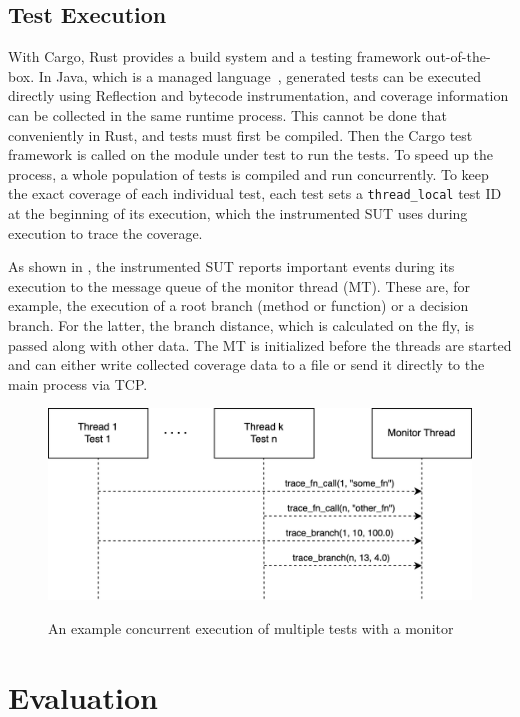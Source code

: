 \documentclass[paper=a4,%
  twoside,%
  BCOR4mm,%
  abstract=true,%
  toc=bibliography,%
  chapterprefix=true,%
  toc=bibliographynumbered,%
  open=right,%
  english,%
  pagesize=pdftex]{scrreprt}
\begin{document}
\section{Test Execution}
With Cargo, Rust provides a build system and a testing framework out-of-the-box. In Java, which is a managed language~\cite{Gough2005}, generated tests can be executed directly using Reflection and bytecode instrumentation, and coverage information can be collected in the same runtime process. This cannot be done that conveniently in Rust, and tests must first be compiled. Then the Cargo test framework is called on the module under test to run the tests. To speed up the process, a whole population of tests is compiled and run concurrently. To keep the exact coverage of each individual test, each test sets a \texttt{thread\string_local} test ID at the beginning of its execution, which the instrumented \ac{SUT} uses during execution to trace the coverage.

As shown in , the instrumented \ac{SUT} reports important events during its execution to the message queue of the monitor thread (MT). These are, for example, the execution of a root branch (method or function) or a decision branch. For the latter, the branch distance, which is calculated on the fly, is passed along with other data. The MT is initialized before the threads are started and can either write collected coverage data to a file or send it directly to the main process via \ac{TCP}.

\begin{figure}[h]
\caption{An example concurrent execution of multiple tests with a monitor}
\centering
\includegraphics[width=\textwidth]{test-execution}
\label{fig:test-execution}
\end{figure}

\clearpage
\chapter{Evaluation}
\label{chap:evaluation}
\end{document}

